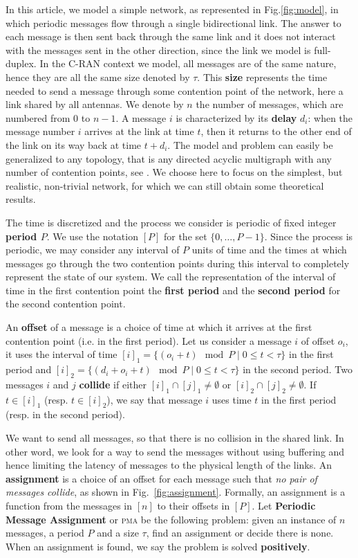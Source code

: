 \documentclass[a4paper,cleveref, autoref, thm-restate,UKenglish]{lipics-v2019}
\newcommand\pma{\textsc{pma}\xspace}
\begin{document}
In this article, we model a simple network, as represented in Fig.\ref{fig:model}, in which periodic messages flow through a single bidirectional link. The answer to each message is then sent back through the same link and it does not interact with the messages sent in the other direction, since the link we model is full-duplex. In the C-RAN context we model, all messages are of the same nature, hence they are all the same size denoted by $\tau$. This \textbf{size} represents the time needed to send a message through some contention point of the network, here a link shared by all antennas. We denote by $n$ the number of messages, which are numbered from $0$ to $n-1$. A message $i$ is characterized by its \textbf{delay} $d_i$: when the message number $i$ arrives at the link at time $t$, then it returns to the other end of the link on its way back at time $t + d_i$. 
 The model and problem can easily be generalized to any topology, that is any directed acyclic multigraph with any number of contention points, see \cite{dominique2018deterministic}. We choose here to focus on the simplest, but realistic, non-trivial network, for which we can still obtain some theoretical results. 

The time is discretized and the process we consider is periodic of fixed integer \textbf{period $P$}. We use the notation $[P]$ for the set $\{0,\dots,P-1\}$. Since the process is periodic, we may consider any interval of $P$ units of time and the times at which messages go through the two contention points during this interval to completely represent the state of our system. We call the representation of the interval of time in the first contention point the \textbf{first period} and the \textbf{second period} for the second contention point.

An \textbf{offset} of a message is a choice of time at which it arrives
at the first contention point (i.e. in the first period). Let us consider a message $i$
of offset $o_i$, it uses the interval of time $[i]_1 = \{ (o_i + t) \mod P \mid 0 \leq t < \tau \}$ in the first period and $[i]_2 = \{ (d_i + o_i + t) \mod P \mid 0 \leq t < \tau \}$ in the second period. Two messages $i$ and $j$ \textbf{collide} if either $[i]_1 \cap [j]_1 \neq \emptyset $ or $[i]_2 \cap [j]_2 \neq \emptyset $. If $t \in [i]_1$ (resp. $t \in [i]_2$), we say that message $i$ uses time $t$ in the first period (resp. in the second period).

We want to send all messages, so that there is no collision in the shared link.
In other word, we look for a way to send the messages without using buffering and 
hence limiting the latency of messages to the physical length of the links. An \textbf{assignment} is a
choice of an offset for each message such that \emph{no pair of messages collide}, as shown in Fig.~\ref{fig:assignment}.
Formally, an assignment is a function from the messages in $[n]$ to their offsets in $[P]$.  
Let \textbf{Periodic Message Assignment} or \pma be the following problem: given an instance of $n$ messages, a period $P$ and a size $\tau$, find an assignment or decide there is none. When an assignment is found, we say the problem is solved \textbf{positively}.
\end{document}
